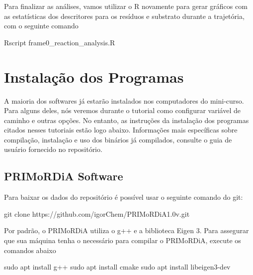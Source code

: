 \documentclass[a4paper,11pt]{refart}
\begin{document}
	Para finalizar as análises, vamos utilizar o R novamente para gerar gráficos com as estatísticas dos descritores para os resíduos e substrato durante a trajetória, com o seguinte comando 

	\hspace*{-\leftmarginwidth}
	\begin{minipage}{\fullwidth}
		\begin{commandshell}Rscript frame0_reaction_analysis.R\end{commandshell}
	\end{minipage}
	
	\section{Instalação dos Programas}
	
	A maioria dos softwares já estarão instalados nos computadores do mini-curso. Para alguns deles, nós veremos durante o tutorial como configurar variável de caminho e outras opções. No entanto, as instruções da instalação dos  programas citados nesses tutoriais  estão logo abaixo. Informações mais específicas sobre compilação, instalação e uso dos binários já compilados, consulte o guia de usuário fornecido no repositório. 
	
	\subsection{PRIMoRDiA Software}
	
	Para baixar os dados do repositório é possível usar o seguinte comando do git:
	
\hspace*{-\leftmarginwidth}
\begin{minipage}{\fullwidth}
\begin{commandshell}git clone https://github.com/igorChem/PRIMoRDiA1.0v.git\end{commandshell}
\end{minipage}
	
	Por padrão, o PRIMoRDiA utiliza o g++ e a biblioteca Eigen 3. Para assegurar que sua máquina tenha o necessário para compilar o PRIMoRDiA, execute os comandos abaixo
	
\hspace*{-\leftmarginwidth}
\begin{minipage}{\fullwidth}
\begin{commandshell}sudo apt install g++
sudo apt install cmake	
sudo apt install libeigen3-dev
\end{commandshell}
\end{minipage}
\end{document}
